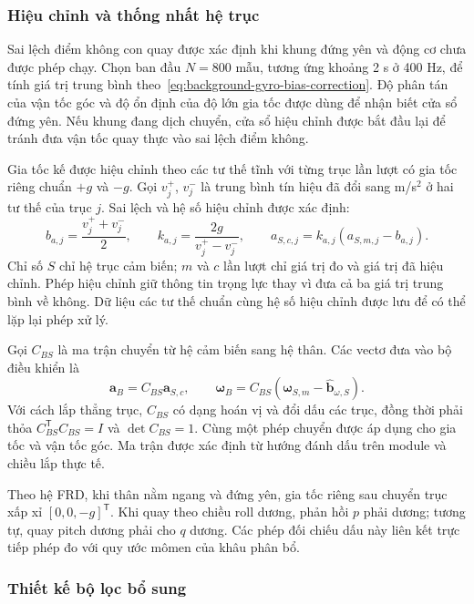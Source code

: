 \subsubsection{Hiệu chỉnh và thống nhất hệ trục}

Sai lệch điểm không con quay được xác định khi khung đứng yên và động cơ chưa được phép chạy. Chọn ban đầu $N=800$ mẫu, tương ứng khoảng 2 s ở 400 Hz, để tính giá trị trung bình theo~\eqref{eq:background-gyro-bias-correction}. Độ phân tán của vận tốc góc và độ ổn định của độ lớn gia tốc được dùng để nhận biết cửa sổ đứng yên. Nếu khung đang dịch chuyển, cửa sổ hiệu chỉnh được bắt đầu lại để tránh đưa vận tốc quay thực vào sai lệch điểm không.

Gia tốc kế được hiệu chỉnh theo các tư thế tĩnh với từng trục lần lượt có gia tốc riêng chuẩn $+g$ và $-g$. Gọi $v_j^+$, $v_j^-$ là trung bình tín hiệu đã đổi sang m/s$^2$ ở hai tư thế của trục $j$. Sai lệch và hệ số hiệu chỉnh được xác định:
\begin{equation}
	b_{a,j}=\frac{v_j^++v_j^-}{2},\qquad
	k_{a,j}=\frac{2g}{v_j^+-v_j^-},\qquad
	a_{S,c,j}=k_{a,j}(a_{S,m,j}-b_{a,j}).
	\label{eq:design-accel-calibration}
\end{equation}
Chỉ số $S$ chỉ hệ trục cảm biến; $m$ và $c$ lần lượt chỉ giá trị đo và giá trị đã hiệu chỉnh. Phép hiệu chỉnh giữ thông tin trọng lực thay vì đưa cả ba giá trị trung bình về không. Dữ liệu các tư thế chuẩn cùng hệ số hiệu chỉnh được lưu để có thể lặp lại phép xử lý.

Gọi $C_{BS}$ là ma trận chuyển từ hệ cảm biến sang hệ thân. Các vectơ đưa vào bộ điều khiển là
\begin{equation}
	\mathbf a_B=C_{BS}\mathbf a_{S,c},\qquad
	\symbf\omega_B=C_{BS}
	(\symbf\omega_{S,m}-\widehat{\mathbf b}_{\omega,S}).
	\label{eq:design-sensor-body-transform}
\end{equation}
Với cách lắp thẳng trục, $C_{BS}$ có dạng hoán vị và đổi dấu các trục, đồng thời phải thỏa $C_{BS}^{\mathsf T}C_{BS}=I$ và $\det C_{BS}=1$. Cùng một phép chuyển được áp dụng cho gia tốc và vận tốc góc. Ma trận được xác định từ hướng đánh dấu trên module và chiều lắp thực tế.

Theo hệ FRD, khi thân nằm ngang và đứng yên, gia tốc riêng sau chuyển trục xấp xỉ $[0,0,-g]^{\mathsf T}$. Khi quay theo chiều roll dương, phản hồi $p$ phải dương; tương tự, quay pitch dương phải cho $q$ dương. Các phép đối chiếu dấu này liên kết trực tiếp phép đo với quy ước mômen của khâu phân bổ.

\subsubsection{Thiết kế bộ lọc bổ sung}


